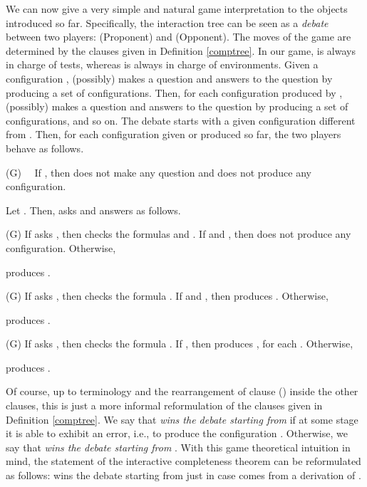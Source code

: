 \documentclass[copyright,creativecommons]{eptcs}
\def\ie{i.e., }
\theoremstyle{definition}
\newcommand{\sqi}{
 \begin{list}{}
  { \setlength{\itemsep}{0pt}
     \setlength{\parsep}{3pt}
     \setlength{\topsep}{3pt}
     \setlength{\partopsep}{0pt}
     \setlength{\leftmargin}{1.4em}
     \setlength{\labelwidth}{1.5em}
     \setlength{\labelsep}{0.3em} } }
\newcommand{\sqe}{
  \end{list}  }
\begin{document}
We can now  give a very simple and natural game interpretation
to the objects introduced so far. Specifically,
the interaction tree can be seen as   a  \emph{debate} between two players:    (Proponent) and  (Opponent). The moves of the game
are determined by   the clauses   given in Definition \ref{comptree}.
In our game,
 is always in charge of tests,
whereas
 is always in charge of environments.
Given a configuration ,
 (possibly)  makes a question and 
answers to the question by  producing a set of configurations. Then, for each  configuration produced by  ,
 (possibly) makes a question and 
answers to the question by  producing a set of configurations,  and so on.
The debate starts with a given configuration  different from . Then, for each configuration  given or  produced so far, the two players
 behave as follows.
\sqi
\item[(G)] \ \  If , then   does not make any question and   does not produce any configuration.

\sqe
Let  . Then,  asks 
and     answers as follows.
\sqi
\item[ (G)]  If    asks  , then
  checks the formulas  and  .
If  and , then   
does \linebreak   not
produce any configuration.
Otherwise,

produces .

\item[ (G)]  If    asks  , then
   checks the formula .
If   and ,
then  
 produces \linebreak  
.
Otherwise,

produces .

\item[ (G)]  If    asks  , then
   checks the formula .
If  ,
then  
 produces \linebreak  
, for each .
Otherwise,

produces .




  \sqe
Of course, up to terminology and the rearrangement of clause ()
inside the other clauses, this is  just a more informal reformulation  of the clauses given in  Definition \ref{comptree}.  We say that  \emph{wins the debate starting
from } if at some stage it is able to exhibit
an error, \ie to produce  the configuration
. Otherwise, we say that  \emph{wins the debate starting
from }.
With this game theoretical intuition in mind,
the statement of the interactive completeness theorem
can be reformulated as follows:   wins
the debate starting
from   just in case
 comes from a derivation  of .
\\
\end{document}
